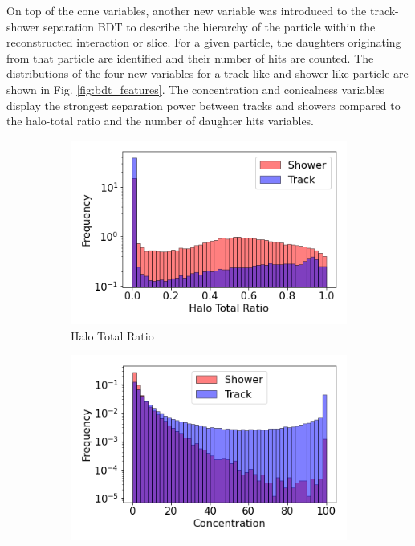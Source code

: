 On top of the cone variables, another new variable was introduced to the track-shower separation BDT to describe the hierarchy of the particle within the reconstructed interaction or slice.
For a given particle, the daughters originating from that particle are identified and their number of hits are counted.
The distributions of the four new variables for a track-like and shower-like particle are shown in Fig. \ref{fig:bdt_features}.
The concentration and conicalness variables display the strongest separation power between tracks and showers compared to the halo-total ratio and the number of daughter hits variables.

\begin{figure}[htbp!]
        \centering
        \begin{subfigure}[b]{0.45\textwidth}
            \centering
            \includegraphics[width=\textwidth]{Feature_Halo_Total_Ratio}
            \caption{Halo Total Ratio}%
            \label{fig:feature_halototalratio}
        \end{subfigure}
        \hfill
        \begin{subfigure}[b]{0.45\textwidth}  
            \centering 
            \includegraphics[width=\textwidth]{Feature_Concentration}

\end{subfigure}
\end{figure}
